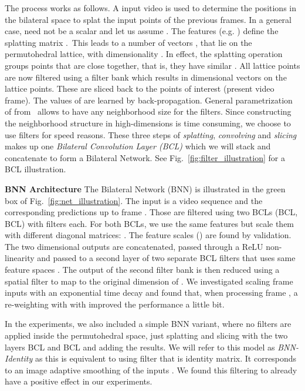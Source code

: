 \documentclass[10pt,twocolumn,letterpaper]{article}
\begin{document}
The process works as follows.
A input video is used to determine the positions in the bilateral space to splat the input points
 of the previous frames. In a general case,  need not be a scalar
and let us assume . The features  (e.g. ) define the splatting matrix .~This leads to a number of vectors , that lie on the permutohedral lattice, with dimensionality .
In effect, the splatting operation groups points that are close together, that is, they have similar .
All lattice points are now filtered using a filter bank  which results in  dimensional vectors on the lattice points.
These are sliced back to the  points of interest (present video frame).
The values of  are learned by back-propagation.
General parametrization of  from~\cite{jampani_2016_cvpr,kiefel2014permutohedral} allows to have
any neighborhood size for the filters. Since constructing the neighborhood structure in
high-dimensions is time consuming, we choose to use  filters for speed reasons.
These three steps of \emph{splatting}, \emph{convolving} and \emph{slicing}
makes up one \emph{Bilateral Convolution Layer (BCL)} which we will stack and concatenate to form a Bilateral Network.
See Fig.~\ref{fig:filter_illustration} for a BCL illustration.

{\bf BNN Architecture} The Bilateral Network (BNN) is illustrated in the green box of
Fig.~\ref{fig:net_illustration}.
The input is a video sequence  and the corresponding predictions  up to frame
. Those are filtered using two BCLs (BCL, BCL) with  filters each.
For both BCLs, we use the same features  but scale them with different diagonal matrices:
. The feature scales () are found by validation.
The two  dimensional outputs are concatenated, passed through a ReLU non-linearity and passed to a
second layer of two separate BCL filters that uses same feature spaces .
The output of the second filter bank is then reduced using a  spatial filter to map to
the original dimension  of .
We investigated scaling frame inputs with an exponential time decay and found that, when processing
frame , a re-weighting with  with
 improved the performance a little bit.

In the experiments, we also included a simple BNN variant,
where no filters are applied inside the permutohedral space, just splatting and slicing
with the two layers BCL and BCL and adding the results.
We will refer to this model as \emph{BNN-Identity} as this is equivalent to using filter
 that is identity matrix. It corresponds to an image adaptive smoothing of the inputs .
We found this filtering to already have a positive effect in our experiments.
\end{document}

